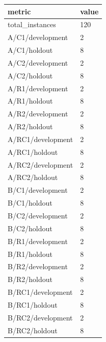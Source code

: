 \begin{tabular}{ll}
 \hline
 metric & value \\
 \hline
 total_instances & 120 \\
 A/C1/development & 2 \\
 A/C1/holdout & 8 \\
 A/C2/development & 2 \\
 A/C2/holdout & 8 \\
 A/R1/development & 2 \\
 A/R1/holdout & 8 \\
 A/R2/development & 2 \\
 A/R2/holdout & 8 \\
 A/RC1/development & 2 \\
 A/RC1/holdout & 8 \\
 A/RC2/development & 2 \\
 A/RC2/holdout & 8 \\
 B/C1/development & 2 \\
 B/C1/holdout & 8 \\
 B/C2/development & 2 \\
 B/C2/holdout & 8 \\
 B/R1/development & 2 \\
 B/R1/holdout & 8 \\
 B/R2/development & 2 \\
 B/R2/holdout & 8 \\
 B/RC1/development & 2 \\
 B/RC1/holdout & 8 \\
 B/RC2/development & 2 \\
 B/RC2/holdout & 8 \\
 \hline
\end{tabular}

